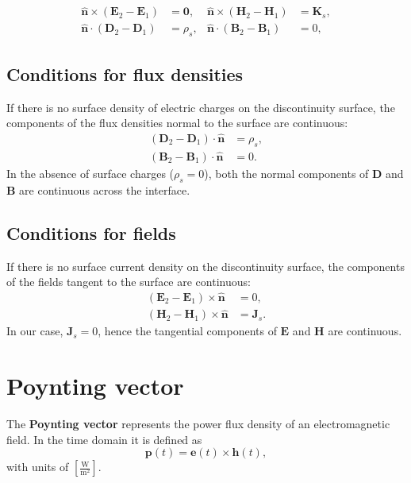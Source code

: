 \begin{align}
    \hat{\mathbf{n}}\times(\mathbf{E}_2-\mathbf{E}_1) &= \mathbf{0}, &
    \hat{\mathbf{n}}\times(\mathbf{H}_2-\mathbf{H}_1) &= \mathbf{K}_s, \\
    \hat{\mathbf{n}}\cdot(\mathbf{D}_2-\mathbf{D}_1) &= \rho_s, &
    \hat{\mathbf{n}}\cdot(\mathbf{B}_2-\mathbf{B}_1) &= 0 ,
\end{align}



\subsection*{Conditions for flux densities}
If there is no surface density of electric charges on the discontinuity surface,  
the components of the flux densities normal to the surface are continuous:
\begin{align}
    (\mathbf{D}_2 - \mathbf{D}_1)\cdot\hat{\mathbf{n}} &= \rho_s,\\
    (\mathbf{B}_2 - \mathbf{B}_1)\cdot\hat{\mathbf{n}} &= 0.
\end{align}
In the absence of surface charges ($\rho_s = 0$), both the normal components of $\mathbf{D}$ and $\mathbf{B}$ are continuous across the interface.

\subsection*{Conditions for fields}
If there is no surface current density on the discontinuity surface,  
the components of the fields tangent to the surface are continuous:
\begin{align}
    (\mathbf{E}_2 - \mathbf{E}_1)\times\hat{\mathbf{n}} &= 0,\\
    (\mathbf{H}_2 - \mathbf{H}_1)\times\hat{\mathbf{n}} &= \mathbf{J}_s.
\end{align}
In our case, $\mathbf{J}_s=0$, hence the tangential components of $\mathbf{E}$ and $\mathbf{H}$ are continuous.

\section{Poynting vector}

The \textbf{Poynting vector} represents the power flux density of an electromagnetic field.  
In the time domain it is defined as
\begin{equation}
    \mathbf{p}(t) = \mathbf{e}(t)\times\mathbf{h}(t),
\end{equation}
with units of $\left[\tfrac{\text{W}}{\text{m}^2}\right]$.

